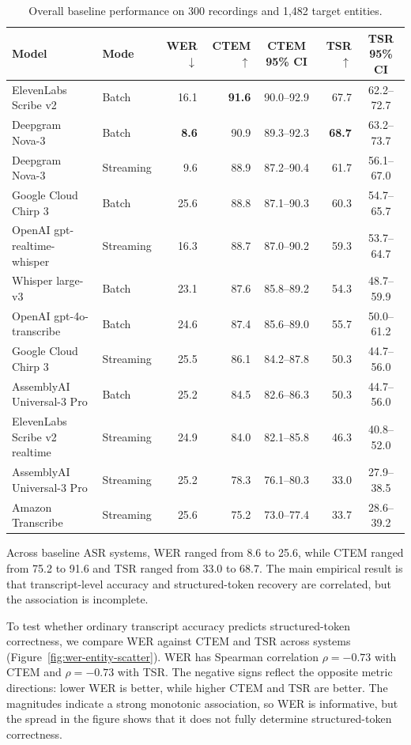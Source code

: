 \documentclass[10pt,twocolumn]{article}
\begin{document}
\begin{table}[t]
	\centering
	\footnotesize
	\setlength{\tabcolsep}{4.5pt}
	\begin{tabular*}{\textwidth}{@{\extracolsep{\fill}}l l r r c r c@{}}
		\toprule
		Model & Mode & WER $\downarrow$ & CTEM $\uparrow$ & CTEM 95\% CI & TSR $\uparrow$ & TSR 95\% CI
		\\
		\midrule
		ElevenLabs Scribe v2 & Batch & 16.1 & \textbf{91.6} & 90.0--92.9 & 67.7 & 62.2--72.7
		\\
		Deepgram Nova-3 & Batch & \textbf{8.6} & 90.9 & 89.3--92.3 & \textbf{68.7} & 63.2--73.7
		\\
		Deepgram Nova-3 & Streaming & 9.6 & 88.9 & 87.2--90.4 & 61.7 & 56.1--67.0
		\\
		Google Cloud Chirp 3 & Batch & 25.6 & 88.8 & 87.1--90.3 & 60.3 & 54.7--65.7
		\\
		OpenAI gpt-realtime-whisper & Streaming & 16.3 & 88.7 & 87.0--90.2 & 59.3 & 53.7--64.7
		\\
		Whisper large-v3 & Batch & 23.1 & 87.6 & 85.8--89.2 & 54.3 & 48.7--59.9
		\\
		OpenAI gpt-4o-transcribe & Batch & 24.6 & 87.4 & 85.6--89.0 & 55.7 & 50.0--61.2
		\\
		Google Cloud Chirp 3 & Streaming & 25.5 & 86.1 & 84.2--87.8 & 50.3 & 44.7--56.0
		\\
		AssemblyAI Universal-3 Pro & Batch & 25.2 & 84.5 & 82.6--86.3 & 50.3 & 44.7--56.0
		\\
		ElevenLabs Scribe v2 realtime & Streaming & 24.9 & 84.0 & 82.1--85.8 & 46.3 & 40.8--52.0
		\\
		AssemblyAI Universal-3 Pro & Streaming & 25.2 & 78.3 & 76.1--80.3 & 33.0 & 27.9--38.5
		\\
		Amazon Transcribe & Streaming & 25.6 & 75.2 & 73.0--77.4 & 33.7 & 28.6--39.2
		\\
		\bottomrule
	\end{tabular*}
	\caption{Overall baseline performance on 300 recordings and 1,482 target entities.}\label{tab:overall-results}
\end{table}

Across baseline ASR systems, WER ranged from 8.6 to 25.6, while CTEM
ranged from 75.2 to 91.6 and TSR ranged from 33.0 to 68.7. The main
empirical result is that transcript-level accuracy and structured-token
recovery are correlated, but the association is incomplete.

To test whether ordinary transcript accuracy predicts structured-token
correctness, we compare WER against CTEM and TSR across systems
(Figure~\ref{fig:wer-entity-scatter}). WER has Spearman correlation
$\rho=-0.73$ with CTEM and $\rho=-0.73$ with TSR\@. The negative signs
reflect the opposite metric directions: lower WER is better, while
higher CTEM and TSR are better. The magnitudes indicate a strong
monotonic association, so WER is informative, but the spread in the
figure shows that it does not fully determine structured-token
correctness.
\end{document}

